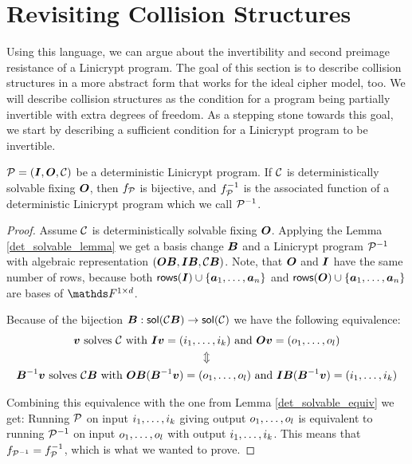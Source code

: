 \section{Revisiting Collision Structures}

Using this language, we can argue about the invertibility and second preimage resistance of a Linicrypt program.
The goal of this section is to describe collision structures in a more abstract form 
that works for the ideal cipher model, too.
We will describe collision structures as the condition for a program being partially invertible with extra degrees of freedom.
As a stepping stone towards this goal, we start by describing a sufficient condition for a Linicrypt program to be invertible.

\begin{lemma}
\label{inversion}
    $\P = (\I, \O, \C)$ be a deterministic Linicrypt program.
    If $\C$ is deterministically solvable fixing $\O$,
    then $f_\P$ is bijective, and $f_\P^{-1}$ is the associated function of a deterministic Linicrypt program which we call $\P^{-1}$.
\end{lemma}

\begin{proof}
Assume $\C$ is deterministically solvable fixing $\O$.
Applying the Lemma \ref{det_solvable_lemma} we get a basis change $\B$
and a Linicrypt program $\P^{-1}$ with algebraic representation $(\O \B, \I \B, \C \B)$.
Note, that $\O$ and $\I$ have the same number of rows, because both $\rows(\I) \cup \{\dts \va n\}$ and
$\rows(\O) \cup \{\dts \va n\}$ are bases of $\F^{1\times\base}$.

Because of the bijection $\B: \sol(\C\B) \to \sol(\C)$ we have the following equivalence:
\begin{gather*}
    \vv \textrm{ solves } \C \textrm{ with }
    \I \vv = (\dts i k) \textrm{ and } \O \vv = (\dts o l) \\
    \Updownarrow \\
    \B^{-1} \vv \textrm{ solves } \C \B \textrm{ with }
    \O \B (\B^{-1} \vv) = (\dts o l)  \textrm{ and }\I \B (\B^{-1} \vv) = (\dts i k)  
\end{gather*}

Combining this equivalence with the one from Lemma \ref{det_solvable_equiv} we get:
Running $\P$ on input $\dts i k$ giving output $\dts o l$ is equivalent to running 
$\P^{-1}$ on input $\dts o l$ with output $\dts i k$.
This means that $f_{\P^{-1}} = f_\P^{-1}$, which is what we wanted to prove.
\end{proof}

